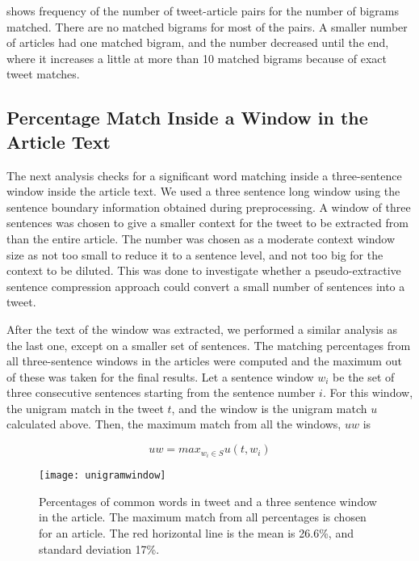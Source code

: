  shows frequency of the number of tweet-article pairs for the number of bigrams matched. There are no matched bigrams for most of the pairs. A smaller number of articles had one matched bigram, and the number decreased until the end, where it increases a little at more than 10 matched bigrams because of exact tweet matches. 


\subsection{Percentage Match Inside a Window in the Article Text}
\label{sec:window}

The next analysis checks for a significant word matching inside a three-sentence window inside the article text. We used a three sentence long window using the sentence boundary information obtained during preprocessing. A window of three sentences was chosen to give a smaller context for the tweet to be extracted from than the entire article. The number was chosen as a moderate context window size as not too small to reduce it to a sentence level, and not too big for the context to be diluted. This was done to investigate whether a pseudo-extractive sentence compression approach could convert a small number of sentences into a tweet.

After the text of the window was extracted, we performed a similar analysis as the last one, except on a smaller set of sentences. The matching percentages from all three-sentence windows in the articles were computed and the maximum out of these was taken for the final results. Let a sentence window $w_i$ be the set of three consecutive sentences starting from the sentence number $i$. For this window, the unigram match in the tweet $t$, and the window is the unigram match $u$ calculated above. Then, the maximum match from all the windows, $uw$ is 

\begin{equation}
uw = max_{w_i \in S} u(t, w_i)
\end{equation}

\begin{figure}[tbp]
\centering
\texttt{[image: unigramwindow]}
\caption{Percentages of common words in tweet and a three sentence window in the article. The maximum match from all percentages is chosen for an article. The red horizontal line is the mean is 26.6\%, and standard deviation 17\%.}
\label{fig:unigramwindow}
\end{figure}

